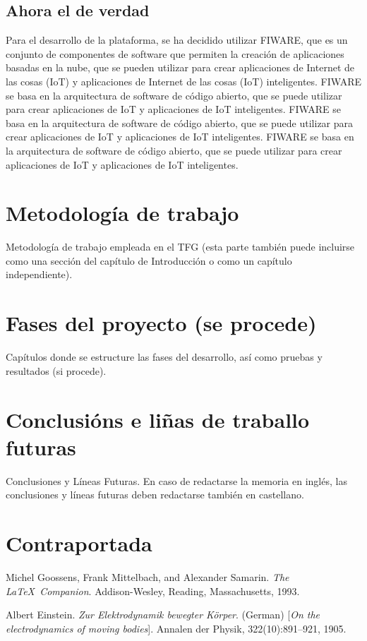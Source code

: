 \documentclass[12pt, a4paper, twoside]{article}
\begin{document}
 \subsection{Ahora el de verdad}
 Para el desarrollo de la plataforma, se ha decidido utilizar FIWARE,
    que es un conjunto de componentes de software que permiten la creación de aplicaciones
    basadas en la nube, que se pueden utilizar para crear aplicaciones de Internet de las cosas
    (IoT) y aplicaciones de Internet de las cosas (IoT) inteligentes. FIWARE se basa en la arquitectura
    de software de código abierto, que se puede utilizar para crear aplicaciones de IoT y aplicaciones
    de IoT inteligentes. FIWARE se basa en la arquitectura de software de código abierto, que se puede
    utilizar para crear aplicaciones de IoT y aplicaciones de IoT inteligentes. FIWARE se basa en la
    arquitectura de software de código abierto, que se puede utilizar para crear aplicaciones de IoT
    y aplicaciones de IoT inteligentes.

 \section{Metodología de trabajo}
 Metodología de trabajo empleada en el TFG (esta parte también puede incluirse como una sección del capítulo de Introducción o como un capítulo independiente).

 \section{Fases del proyecto (se procede)}
 Capítulos donde se estructure las fases del desarrollo, así como pruebas y resultados (si procede). 

\section{Conclusións e liñas de traballo futuras}
Conclusiones y Líneas Futuras. En caso de redactarse la memoria en inglés, las conclusiones y líneas futuras deben redactarse también en castellano.

\section{Contraportada}
\begin{thebibliography}{9}
    Michel Goossens, Frank Mittelbach, and Alexander Samarin. 
    \textit{The \LaTeX\ Companion}. 
    Addison-Wesley, Reading, Massachusetts, 1993.
    
    Albert Einstein. 
    \textit{Zur Elektrodynamik bewegter K{\"o}rper}. (German) 
    [\textit{On the electrodynamics of moving bodies}]. 
    Annalen der Physik, 322(10):891–921, 1905.
\end{thebibliography}
\end{document}
